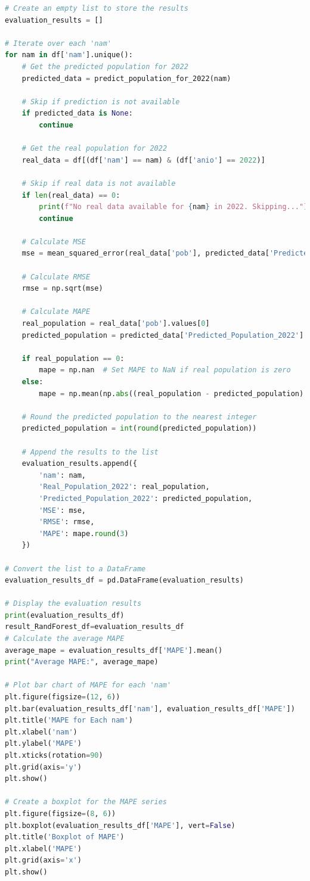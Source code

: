 \documentclass{article}
\theoremstyle{mytheoremstyle}
\theoremstyle{mytheoremstyle}
\theoremstyle{myproblemstyle}
\begin{document}
\begin{lstlisting}[language=Python, caption=Random Forest.ipynb,label={lst:RANDOMT.ipynb}]
# Create an empty list to store the results
evaluation_results = []

# Iterate over each 'nam'
for nam in df['nam'].unique():
    # Get the predicted population for 2022
    predicted_data = predict_population_for_2022(nam)
    
    # Skip if prediction is not available
    if predicted_data is None:
        continue
    
    # Get the real population for 2022
    real_data = df[(df['nam'] == nam) & (df['anio'] == 2022)]
    
    # Skip if real data is not available
    if len(real_data) == 0:
        print(f"No real data available for {nam} in 2022. Skipping...")
        continue
    
    # Calculate MSE
    mse = mean_squared_error(real_data['pob'], predicted_data['Predicted_Population_2022'])
    
    # Calculate RMSE
    rmse = np.sqrt(mse)
    
    # Calculate MAPE
    real_population = real_data['pob'].values[0]
    predicted_population = predicted_data['Predicted_Population_2022'].values[0]
    
    if real_population == 0:
        mape = np.nan  # Set MAPE to NaN if real population is zero
    else:
        mape = np.mean(np.abs((real_population - predicted_population) / real_population)) * 100
    
    # Round the predicted population to the nearest integer
    predicted_population = int(round(predicted_population))
    
    # Append the results to the list
    evaluation_results.append({
        'nam': nam,
        'Real_Population_2022': real_population,
        'Predicted_Population_2022': predicted_population,
        'MSE': mse,
        'RMSE': rmse,
        'MAPE': mape.round(3)
    })

# Convert the list to a DataFrame
evaluation_results_df = pd.DataFrame(evaluation_results)

# Display the evaluation results
print(evaluation_results_df)
result_RandForest_df=evaluation_results_df
# Calculate the average MAPE
average_mape = evaluation_results_df['MAPE'].mean()
print("Average MAPE:", average_mape)

# Plot bar chart of MAPE for each 'nam'
plt.figure(figsize=(12, 6))
plt.bar(evaluation_results_df['nam'], evaluation_results_df['MAPE'])
plt.title('MAPE for Each nam')
plt.xlabel('nam')
plt.ylabel('MAPE')
plt.xticks(rotation=90)
plt.grid(axis='y')
plt.show()

# Create a boxplot for the MAPE series
plt.figure(figsize=(8, 6))
plt.boxplot(evaluation_results_df['MAPE'], vert=False)
plt.title('Boxplot of MAPE')
plt.xlabel('MAPE')
plt.grid(axis='x')
plt.show()
  \end{lstlisting}
\end{document}
